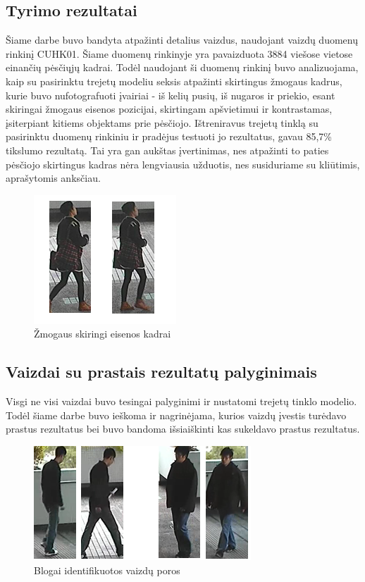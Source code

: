 \documentclass{VUMIFPSkursinis}
\begin{document}
\subsection{Tyrimo rezultatai}
Šiame darbe buvo bandyta atpažinti detalius vaizdus, naudojant vaizdų duomenų rinkinį CUHK01. Šiame duomenų rinkinyje yra pavaizduota 3884 viešose vietose einančių pėsčiųjų kadrai. Todėl naudojant ši duomenų rinkinį buvo analizuojama, kaip su pasirinktu trejetų modeliu seksis atpažinti skirtingus žmogaus kadrus, kurie buvo nufotografuoti įvairiai -  iš kelių pusių, iš nugaros ir priekio, esant skiringai žmogaus eisenos pozicijai, skirtingam apšvietimui ir kontrastamas, įsiterpiant kitiems objektams prie pėsčiojo.
\linebreak
Ištreniravus trejetų tinklą su pasirinktu duomenų rinkiniu ir pradėjus testuoti jo rezultatus, gavau 85,7\% tikslumo rezultatą. Tai yra gan aukštas įvertinimas, nes atpažinti to paties pėsčiojo skirtingus kadras nėra lengviausia užduotis, nes susiduriame su kliūtimis, aprašytomis anksčiau.

\begin{figure}[H]
\centering
\includegraphics[scale=1.0]{img/Frame_diff.png}
\caption{Žmogaus skiringi eisenos kadrai} %
\label{img:mlp}
\end{figure}
\subsection{Vaizdai su prastais rezultatų palyginimais}
Visgi ne visi vaizdai buvo tesingai palyginimi ir nustatomi trejetų tinklo modelio. Todėl šiame darbe buvo ieškoma ir nagrinėjama, kurios vaizdų įvestis turėdavo prastus rezultatus bei buvo bandoma išsiaiškinti kas sukeldavo prastus rezultatus.

\begin{figure}[H]
\centering
\includegraphics[scale=1.0]{img/Wrongly_detected.png}
\caption{Blogai identifikuotos vaizdų poros} %
\label{img:mlp}
\end{figure}
\end{document}
